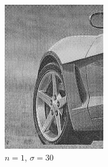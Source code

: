 \documentclass[
	12pt, %
]{style/fphw}
\begin{document}
\begin{figure}[H]
\begin{subfigure}[b]{.22\textwidth}
             \includegraphics[width=\textwidth]{plots2/Q5_3_1_30.png}
             \caption{$n=1$, $\sigma=30$}
             \label{Q5_3_1_30}
         \end{subfigure}
         \hfill
         \begin{subfigure}[b]{.22\textwidth}
             \centering

\end{subfigure}
\end{figure}
\end{document}
